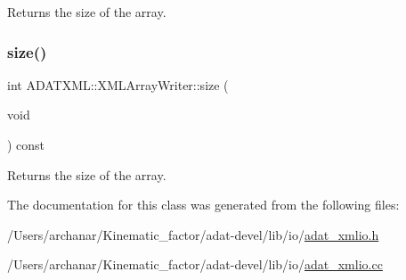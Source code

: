 Returns the size of the array. 

\mbox{\label{classADATXML_1_1XMLArrayWriter_a152ffb3695b1f644614a7ca7ca86efa0}} 
\subsubsection{\texorpdfstring{size()}{size()}\hspace{0.1cm}{\footnotesize\ttfamily [3/3]}}
{\footnotesize\ttfamily int A\+D\+A\+T\+X\+M\+L\+::\+X\+M\+L\+Array\+Writer\+::size (\begin{DoxyParamCaption}\item[{void}]{ }\end{DoxyParamCaption}) const\hspace{0.3cm}{\ttfamily [inline]}}



Returns the size of the array. 



The documentation for this class was generated from the following files\+:\begin{DoxyCompactItemize}
\item 
/\+Users/archanar/\+Kinematic\+\_\+factor/adat-\/devel/lib/io/\mbox{\hyperlink{adat-devel_2lib_2io_2adat__xmlio_8h}{adat\+\_\+xmlio.\+h}}\item 
/\+Users/archanar/\+Kinematic\+\_\+factor/adat-\/devel/lib/io/\mbox{\hyperlink{adat-devel_2lib_2io_2adat__xmlio_8cc}{adat\+\_\+xmlio.\+cc}}\end{DoxyCompactItemize}
